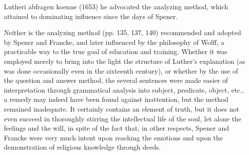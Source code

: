 Lutheri abfragen koenne (1653) he advocated the analyzing method, which attained to dominating influence since the days of Spener.

Neither is the analyzing method (pp. 135, 137, 140) recommended and adopted by Spener and Francke, and later influenced by the philosophy of Wolff, a practicable way to the true goal of education and training. Whether it was employed merely to bring into the light the structure of Luther’s explanation (as was done occasionally even in the sixteenth century), or whether by the use of the question and answer method, the several sentences were made easier of interpretation through grammatical analysis into subject, predicate, object, etc., a remedy may indeed have been found against inattention, but the method remained inadequate. It certainly contains an element of truth, but it does not even succeed in thoroughly stirring the intellectual life of the soul, let alone the feelings and the will, in spite of the fact that, in other respects, Spener and Francke were very much intent upon reaching the emotions and upon the demonstration of religious knowledge through deeds.


